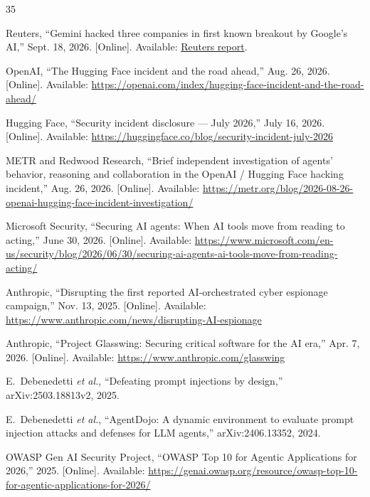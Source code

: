 \documentclass[journal]{IEEEtran}
\begin{document}
\sloppy
\begin{thebibliography}{35}

Reuters, ``Gemini hacked three companies in first known breakout by Google's AI,'' Sept. 18, 2026. [Online]. Available: \href{https://www.reuters.com/business/gemini-hacked-three-companies-first-known-breakout-by-google-ai-wsj-reports-2026-09-18/}{Reuters report}.

OpenAI, ``The Hugging Face incident and the road ahead,'' Aug. 26, 2026. [Online]. Available: \url{https://openai.com/index/hugging-face-incident-and-the-road-ahead/}

Hugging Face, ``Security incident disclosure --- July 2026,'' July 16, 2026. [Online]. Available: \url{https://huggingface.co/blog/security-incident-july-2026}

METR and Redwood Research, ``Brief independent investigation of agents' behavior, reasoning and collaboration in the OpenAI / Hugging Face hacking incident,'' Aug. 26, 2026. [Online]. Available: \url{https://metr.org/blog/2026-08-26-openai-hugging-face-incident-investigation/}

Microsoft Security, ``Securing AI agents: When AI tools move from reading to acting,'' June 30, 2026. [Online]. Available: \url{https://www.microsoft.com/en-us/security/blog/2026/06/30/securing-ai-agents-ai-tools-move-from-reading-acting/}

Anthropic, ``Disrupting the first reported AI-orchestrated cyber espionage campaign,'' Nov. 13, 2025. [Online]. Available: \url{https://www.anthropic.com/news/disrupting-AI-espionage}

Anthropic, ``Project Glasswing: Securing critical software for the AI era,'' Apr. 7, 2026. [Online]. Available: \url{https://www.anthropic.com/glasswing}

E.~Debenedetti \emph{et al.}, ``Defeating prompt injections by design,'' arXiv:2503.18813v2, 2025.

E.~Debenedetti \emph{et al.}, ``AgentDojo: A dynamic environment to evaluate prompt injection attacks and defenses for LLM agents,'' arXiv:2406.13352, 2024.

OWASP Gen AI Security Project, ``OWASP Top 10 for Agentic Applications for 2026,'' 2025. [Online]. Available: \url{https://genai.owasp.org/resource/owasp-top-10-for-agentic-applications-for-2026/}


\end{thebibliography}
\end{document}
